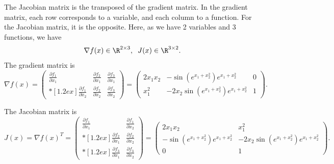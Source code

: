 
The Jacobian matrix is the transposed of the gradient matrix. In the
gradient matrix, each row corresponds to a variable, and each column
to a function. For the Jacobian matrix, it is the opposite. Here, as
we have 2 variables and 3 functions, we have
\[
\nabla f(x) \in \R^{2 \times 3}, \;\;J(x) \in \R^{3\times 2}.
\]
The gradient matrix is
\[
\nabla f(x)
=
\begin{pmatrix}
   \frac{\partial f_1}{\partial x_1}      & \frac{\partial f_2}{\partial x_1}  & \frac{\partial f_3}{\partial x_1} \\*[1.2ex]
    \frac{\partial f_1}{\partial x_2}       & \frac{\partial f_2}{\partial x_2}
 & \frac{\partial f_3}{\partial x_2}\end{pmatrix}
=
\begin{pmatrix}
   2x_1x_2      & -\sin(e^{x_1+x_2^2})e^{x_1+x_2^2} & 0\\
    x_1^2      & -2x_2\sin(e^{x_1+x_2^2})e^{x_1+x_2^2} & 1
    \end{pmatrix}.
\]

The Jacobian matrix is
\[
   J(x)=\nabla f(x)^T
=
\begin{pmatrix}
   \frac{\partial f_1}{\partial x_1}      & \frac{\partial f_1}{\partial x_2} \\*[1.2ex]
    \frac{\partial f_2}{\partial x_1}       & \frac{\partial
      f_2}{\partial x_2} \\*[1.2ex]
    \frac{\partial f_3}{\partial x_1}       & \frac{\partial
      f_3}{\partial x_2} 
\end{pmatrix}
=
\begin{pmatrix}
   2x_1x_2      &   x_1^2 \\
    -\sin(e^{x_1+x_2^2})e^{x_1+x_2^2}    &
    -2x_2\sin(e^{x_1+x_2^2})e^{x_1+x_2^2} \\
    0 & 1
\end{pmatrix}.
\]

